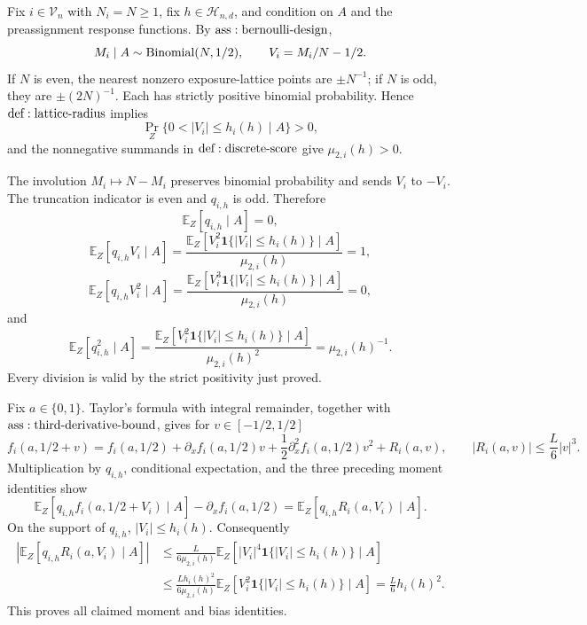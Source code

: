 Fix \(i\in\mathcal V_n\) with \(N_i=N\geq1\), fix \(h\in\mathcal H_{n,d}\), and condition on \(A\) and the preassignment response functions.  By \({\rm ass:bernoulli\text{-}design}\),
\[
 M_i\mid A\sim {\rm Binomial}(N,1/2),\qquad V_i=M_i/N-1/2.
\]
If \(N\) is even, the nearest nonzero exposure-lattice points are \(\pm N^{-1}\); if \(N\) is odd, they are \(\pm(2N)^{-1}\).  Each has strictly positive binomial probability.  Hence \({\rm def:lattice\text{-}radius}\) implies
\[
 \Pr_Z\{0<|V_i|\leq h_i(h)\mid A\}>0,
\]
and the nonnegative summands in \({\rm def:discrete\text{-}score}\) give \(\mu_{2,i}(h)>0\).

The involution \(M_i\mapsto N-M_i\) preserves binomial probability and sends \(V_i\) to \(-V_i\).  The truncation indicator is even and \(q_{i,h}\) is odd.  Therefore
\[
 \mathbb E_Z[q_{i,h}\mid A]=0,
\]
\[
 \mathbb E_Z[q_{i,h}V_i\mid A]
 =\frac{\mathbb E_Z[V_i^2\mathbf1\{|V_i|\leq h_i(h)\}\mid A]}{\mu_{2,i}(h)}=1,
\]
\[
 \mathbb E_Z[q_{i,h}V_i^2\mid A]
 =\frac{\mathbb E_Z[V_i^3\mathbf1\{|V_i|\leq h_i(h)\}\mid A]}{\mu_{2,i}(h)}=0,
\]
and
\[
 \mathbb E_Z[q_{i,h}^2\mid A]
 =\frac{\mathbb E_Z[V_i^2\mathbf1\{|V_i|\leq h_i(h)\}\mid A]}{\mu_{2,i}(h)^2}
 =\mu_{2,i}(h)^{-1}.
\]
Every division is valid by the strict positivity just proved.

Fix \(a\in\{0,1\}\).  Taylor's formula with integral remainder, together with \({\rm ass:third\text{-}derivative\text{-}bound}\), gives for \(v\in[-1/2,1/2]\)
\[
 f_i(a,1/2+v)=f_i(a,1/2)+\partial_xf_i(a,1/2)v
 +\frac12\partial_x^2f_i(a,1/2)v^2+R_i(a,v),
 \qquad |R_i(a,v)|\leq \frac L6|v|^3.
\]
Multiplication by \(q_{i,h}\), conditional expectation, and the three preceding moment identities show
\[
 \mathbb E_Z[q_{i,h}f_i(a,1/2+V_i)\mid A]-\partial_xf_i(a,1/2)
 =\mathbb E_Z[q_{i,h}R_i(a,V_i)\mid A].
\]
On the support of \(q_{i,h}\), \(|V_i|\leq h_i(h)\).  Consequently
\[
\begin{aligned}
 \left|\mathbb E_Z[q_{i,h}R_i(a,V_i)\mid A]\right|
 &\leq \frac{L}{6\mu_{2,i}(h)}
 \mathbb E_Z[|V_i|^4\mathbf1\{|V_i|\leq h_i(h)\}\mid A]\\
 &\leq \frac{Lh_i(h)^2}{6\mu_{2,i}(h)}
 \mathbb E_Z[V_i^2\mathbf1\{|V_i|\leq h_i(h)\}\mid A]
 =\frac L6h_i(h)^2.
\end{aligned}
\]
This proves all claimed moment and bias identities.